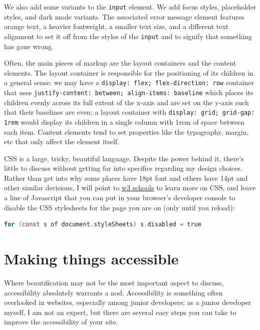 \documentclass[11pt, twoside, reqno]{book}
\begin{document}
We also add some variants to the \texttt{input} element. We add focus styles, placeholder styles, and dark mode variants. The associated error message element features orange text, a heavier fontweight, a smaller text size, and a different text alignment to set it off from the styles of the \texttt{input} and to signify that something has gone wrong.

Often, the main pieces of markup are the layout containers and the content elements. The layout container is responsible for the positioning of its children in a general sense: we may have a \texttt{display: flex; flex-direction: row} container that uses \texttt{justify-content: between; align-items: baseline} which places its children evenly across its full extent of the x-axis and are set on the y-axis such that their baselines are even; a layout container with \texttt{display: grid; grid-gap: 1rem} would display its children in a single column with 1rem of space between each item. Content elements tend to set properties like the typography, margin, etc that only affect the element itself.

CSS is a large, tricky, beautiful language. Despite the power behind it, there's little to discuss without getting far into specifics regarding my design choices. Rather than get into why some places have 18pt font and others have 14pt and other similar decisions, I will point to \href{https://www.w3schools.com/css/default.asp}{w3 schools} to learn more on CSS, and leave a line of Javascript that you can put in your browser's developer console to disable the CSS stylesheets for the page you are on (only until you reload):
\begin{lstlisting}[language=C]
for (const s of document.styleSheets) s.disabled = true
\end{lstlisting}

\section{Making things accessible}

Where beautification may not be the most important aspect to discuss, accessibility absolutely warrants a nod. Accessibility is something often overlooked in websites, especially among junior developers; as a junior developer myself, I am not an expert, but there are several easy steps you can take to improve the accessibility of your site.
\end{document}
